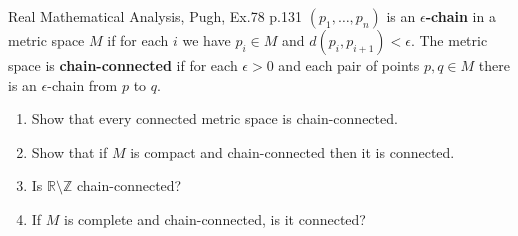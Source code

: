 \begin{problem}{}{}{Real Mathematical Analysis, Pugh, Ex.78 p.131}
$(p_1,\dots,p_n)$ is an \textbf{$\epsilon$-chain} in a metric space $M$ if for each $i$ we have $p_i \in M$ and $d(p_i,p_{i+1}) < \epsilon$.
The metric space is \textbf{chain-connected} if for each $\epsilon > 0$ and each pair of points $p,q \in M$ there is an $\epsilon$-chain from $p$ to $q$.
\begin{enumerate}
    \item[(a)] Show that every connected metric space is chain-connected.
    \item[(b)] Show that if $M$ is compact and chain-connected then it is connected.
    \item[(c)] Is $\mathbb{R} \setminus \mathbb{Z}$ chain-connected?
    \item[(d)] If $M$ is complete and chain-connected, is it connected?
\end{enumerate}
\end{problem}

